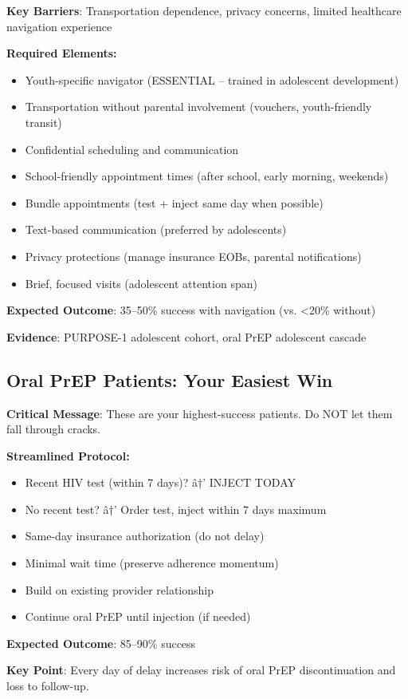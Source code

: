 \documentclass[11pt]{article}
\begin{document}
\begin{tcolorbox}[colback=orange!10!white,colframe=orange!75!black,title=\textbf{Adolescents (16--24): Youth-Specific Approach},breakable]
\textbf{Key Barriers}: Transportation dependence, privacy concerns, limited healthcare navigation experience

\textbf{Required Elements:}
\begin{itemize}[leftmargin=*]
\item Youth-specific navigator (ESSENTIAL -- trained in adolescent development)
\item Transportation without parental involvement (vouchers, youth-friendly transit)
\item Confidential scheduling and communication
\item School-friendly appointment times (after school, early morning, weekends)
\item Bundle appointments (test + inject same day when possible)
\item Text-based communication (preferred by adolescents)
\item Privacy protections (manage insurance EOBs, parental notifications)
\item Brief, focused visits (adolescent attention span)
\end{itemize}

\textbf{Expected Outcome}: 35--50\% success with navigation (vs. <20\% without)

\textbf{Evidence}: PURPOSE-1 adolescent cohort, oral PrEP adolescent cascade
\end{tcolorbox}

\subsection{Oral PrEP Patients: Your Easiest Win}

\begin{tcolorbox}[colback=green!10!white,colframe=green!75!black,title=\textbf{Current Oral PrEP Users: Highest Success Opportunity},breakable]
\textbf{Critical Message}: These are your highest-success patients. Do NOT let them fall through cracks.

\textbf{Streamlined Protocol:}
\begin{itemize}[leftmargin=*]
\item Recent HIV test (within 7 days)? â†’ INJECT TODAY
\item No recent test? â†’ Order test, inject within 7 days maximum
\item Same-day insurance authorization (do not delay)
\item Minimal wait time (preserve adherence momentum)
\item Build on existing provider relationship
\item Continue oral PrEP until injection (if needed)
\end{itemize}

\textbf{Expected Outcome}: 85--90\% success

\textbf{Key Point}: Every day of delay increases risk of oral PrEP discontinuation and loss to follow-up.
\end{tcolorbox}
\end{document}
